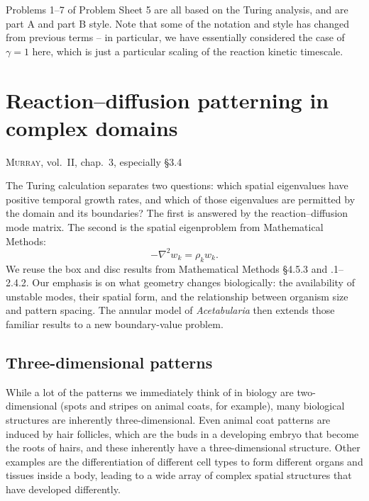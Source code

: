\documentclass[main.tex]{subfiles}
\begin{document}
\begin{do-it-yourself}
Problems 1--7 of Problem Sheet 5 are all based on the Turing analysis, and are part A and part B style.  Note that some of the notation and style has changed from previous terms -- in particular, we have essentially considered the case of $\gamma=1$ here, which is just a particular scaling of the reaction kinetic timescale. 
\end{do-it-yourself}



\chapter{Reaction--diffusion patterning in complex domains}
\begin{extra-reading}
\textsc{Murray}, vol.~II, chap.~3, especially \S3.4
\end{extra-reading}

The Turing calculation separates two questions: which spatial eigenvalues have positive temporal growth rates, and which of those eigenvalues are permitted by the domain and its boundaries? The first is answered by the reaction--diffusion mode matrix. The second is the spatial eigenproblem from Mathematical Methods:
\[
-\nabla^2w_k=\rho_kw_k.
\]
We reuse the box and disc results from Mathematical Methods \S4.5.3 and .1--2.4.2. Our emphasis is on what geometry changes biologically: the availability of unstable modes, their spatial form, and the relationship between organism size and pattern spacing. The annular model of \emph{Acetabularia} then extends those familiar results to a new boundary-value problem.

\section{Three-dimensional patterns}\label{3D_Patterns}

While a lot of the patterns we immediately think of in biology are two-dimensional (spots and stripes on animal coats, for example), many biological structures are inherently three-dimensional. Even animal coat patterns are induced by hair follicles, which are the buds in a developing embryo that become the roots of hairs, and these inherently have a three-dimensional structure. Other examples are the differentiation of different cell types to form different organs and tissues inside a body, leading to a wide array of complex spatial structures that have developed differently. 
\end{document}
